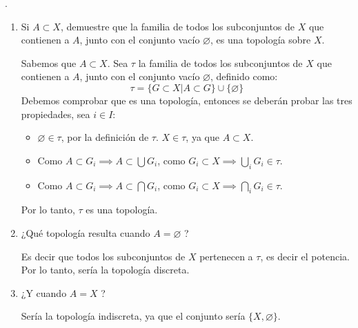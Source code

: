 





\begin{problema}[Problema 1]
    .
    \begin{enumerate}
        \item Si $A \subset X$, demuestre que la familia de todos los subconjuntos de $X$ que contienen a $A$, junto con el conjunto vacío $\varnothing$, es una topología sobre $X$.
  
        \begin{dem}
            Sabemos que $A\subset X$. Sea $\tau$ la familia de todos los subconjuntos de $X$ que contienen a $A$, junto con el conjunto vacío $\varnothing$, definido como: 
            $$\tau = \{G\subset X| A\subset G\}\cup \{\varnothing\}$$
            Debemos comprobar que es una topología, entonces se deberán probar las tres propiedades, sea $i\in I$: 
            \begin{itemize}
                \item $\varnothing\in \tau$, por la definición de $\tau$. $X\in \tau$, ya que $A\subset X$.
                \item Como $A\subset G_i\implies A\subset \bigcup G_i$, como $G_i\subset X\implies \bigcup_i G_i\in \tau$.
                \item Como $A\subset G_i\implies A\subset \bigcap G_i$, como $G_i\subset X\implies \bigcap_i G_i\in \tau$.
            \end{itemize}
            Por lo tanto, $\tau$ es una topología.
        \end{dem}
        \item ¿Qué topología resulta cuando $A=\varnothing$ ?
        \begin{sol}
            Es decir que todos los subconjuntos de $X$ pertenecen a $\tau$, es decir el potencia. Por lo tanto, sería la topología discreta. 
        \end{sol}      
        \item ¿Y cuando $A=X$ ?
        \begin{sol}
            Sería la topología indiscreta, ya que el conjunto sería $\{X,\varnothing\}$.
        \end{sol} 
    \end{enumerate}
\end{problema}

